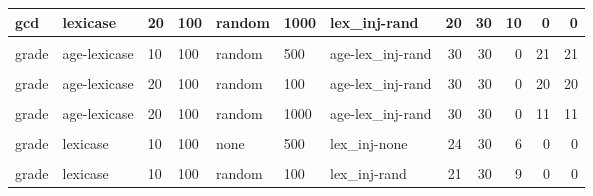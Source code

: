 \documentclass[
]{book}
\begin{document}
\begin{table}
\begin{tabular}{l|l|l|l|l|l|l|r|r|r|r|r}
\hline
gcd & lexicase & 20 & 100 & random & 1000 & lex\_inj-rand & 20 & 30 & 10 & 0 & 0\\
\hline
\cellcolor{gray!6}{grade} & \cellcolor{gray!6}{age-lexicase} & \cellcolor{gray!6}{10} & \cellcolor{gray!6}{100} & \cellcolor{gray!6}{random} & \cellcolor{gray!6}{100} & \cellcolor{gray!6}{age-lex\_inj-rand} & \cellcolor{gray!6}{30} & \cellcolor{gray!6}{30} & \cellcolor{gray!6}{0} & \cellcolor{gray!6}{21} & \cellcolor{gray!6}{21}\\
\hline
grade & age-lexicase & 10 & 100 & random & 500 & age-lex\_inj-rand & 30 & 30 & 0 & 21 & 21\\
\hline
\cellcolor{gray!6}{grade} & \cellcolor{gray!6}{age-lexicase} & \cellcolor{gray!6}{10} & \cellcolor{gray!6}{100} & \cellcolor{gray!6}{random} & \cellcolor{gray!6}{1000} & \cellcolor{gray!6}{age-lex\_inj-rand} & \cellcolor{gray!6}{30} & \cellcolor{gray!6}{30} & \cellcolor{gray!6}{0} & \cellcolor{gray!6}{16} & \cellcolor{gray!6}{16}\\
\hline
grade & age-lexicase & 20 & 100 & random & 100 & age-lex\_inj-rand & 30 & 30 & 0 & 20 & 20\\
\hline
\cellcolor{gray!6}{grade} & \cellcolor{gray!6}{age-lexicase} & \cellcolor{gray!6}{20} & \cellcolor{gray!6}{100} & \cellcolor{gray!6}{random} & \cellcolor{gray!6}{500} & \cellcolor{gray!6}{age-lex\_inj-rand} & \cellcolor{gray!6}{30} & \cellcolor{gray!6}{30} & \cellcolor{gray!6}{0} & \cellcolor{gray!6}{12} & \cellcolor{gray!6}{12}\\
\hline
grade & age-lexicase & 20 & 100 & random & 1000 & age-lex\_inj-rand & 30 & 30 & 0 & 11 & 11\\
\hline
\cellcolor{gray!6}{grade} & \cellcolor{gray!6}{lexicase} & \cellcolor{gray!6}{10} & \cellcolor{gray!6}{100} & \cellcolor{gray!6}{none} & \cellcolor{gray!6}{100} & \cellcolor{gray!6}{lex\_inj-none} & \cellcolor{gray!6}{20} & \cellcolor{gray!6}{30} & \cellcolor{gray!6}{10} & \cellcolor{gray!6}{0} & \cellcolor{gray!6}{0}\\
\hline
grade & lexicase & 10 & 100 & none & 500 & lex\_inj-none & 24 & 30 & 6 & 0 & 0\\
\hline
\cellcolor{gray!6}{grade} & \cellcolor{gray!6}{lexicase} & \cellcolor{gray!6}{10} & \cellcolor{gray!6}{100} & \cellcolor{gray!6}{none} & \cellcolor{gray!6}{1000} & \cellcolor{gray!6}{lex\_inj-none} & \cellcolor{gray!6}{23} & \cellcolor{gray!6}{30} & \cellcolor{gray!6}{7} & \cellcolor{gray!6}{0} & \cellcolor{gray!6}{0}\\
\hline
grade & lexicase & 10 & 100 & random & 100 & lex\_inj-rand & 21 & 30 & 9 & 0 & 0\\

\end{tabular}
\end{table}
\end{document}
